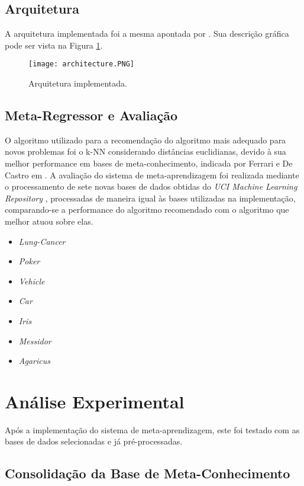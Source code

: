 \documentclass[runningheads]{llncs}
\begin{document}
\subsection{Arquitetura}

A arquitetura implementada foi a mesma apontada por \cite{kalousis}. Sua descrição gráfica pode ser vista na Figura \ref{arch}.

\begin{figure}[ht]
\texttt{[image: architecture.PNG]}
\caption{Arquitetura implementada.} \label{arch}
\end{figure}

\subsection{Meta-Regressor e Avaliação}

O algoritmo utilizado para a recomendação do algoritmo mais adequado para novos problemas foi o k-NN considerando distâncias euclidianas, devido à sua melhor performance em bases de meta-conhecimento, indicada por Ferrari e De Castro em \cite{clustering}. A avaliação do sistema de meta-aprendizagem foi realizada mediante o processamento de sete novas bases de dados obtidas do \emph{UCI Machine Learning Repository} \cite{uci}, processadas de maneira igual às bases utilizadas na implementação, comparando-se a performance do algoritmo recomendado com o algoritmo que melhor atuou sobre elas.

\begin{itemize}
\item \emph{Lung-Cancer}
\item \emph{Poker}
\item \emph{Vehicle}
\item \emph{Car}
\item \emph{Iris}
\item \emph{Messidor}
\item \emph{Agaricus}
\end{itemize}

\section{Análise Experimental}

Após a implementação do sistema de meta-aprendizagem, este foi testado com as bases de dados selecionadas e já pré-processadas.

\subsection{Consolidação da Base de Meta-Conhecimento}
\end{document}
